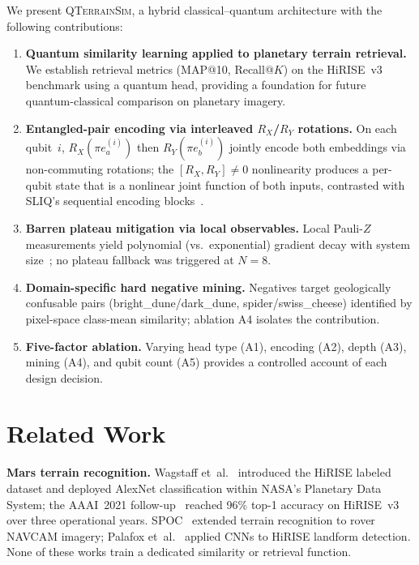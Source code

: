 \documentclass[conference,a4paper]{IEEEtran}
\newcommand{\qts}{\textsc{QTerrainSim}}
\newcommand{\RX}{R_X}
\newcommand{\RY}{R_Y}
\newcommand{\PauliZ}{Z}
\begin{document}
We present \qts{}, a hybrid classical–quantum architecture with the
following contributions:

\begin{enumerate}
\item \textbf{Quantum similarity learning applied to planetary terrain
      retrieval.}
      We establish retrieval metrics (MAP@10, Recall@$K$) on the
      HiRISE~v3 benchmark using a quantum head, providing a foundation for
      future quantum-classical comparison on planetary imagery.

\item \textbf{Entangled-pair encoding via interleaved \boldmath$\RX$/$\RY$
      rotations.}
      On each qubit~$i$, $\RX(\pi e_a^{(i)})$ then $\RY(\pi e_b^{(i)})$
      jointly encode both embeddings via non-commuting rotations; the
      $[\RX,\RY]\neq0$ nonlinearity produces a per-qubit state that is a
      nonlinear joint function of both inputs, contrasted with SLIQ's
      sequential encoding blocks~\cite{silver2023sliq}.

\item \textbf{Barren plateau mitigation via local observables.}
      Local Pauli-$\PauliZ$ measurements yield polynomial (vs.\ exponential)
      gradient decay with system size~\cite{cerezo2021costbarren}; no
      plateau fallback was triggered at $N=8$.

\item \textbf{Domain-specific hard negative mining.}
      Negatives target geologically confusable pairs (bright\_dune/dark\_dune,
      spider/swiss\_cheese) identified by pixel-space class-mean similarity;
      ablation A4 isolates the contribution.

\item \textbf{Five-factor ablation.}
      Varying head type (A1), encoding (A2), depth (A3), mining (A4), and
      qubit count (A5) provides a controlled account of each design decision.
\end{enumerate}


\section{Related Work}
\label{sec:related}

\textbf{Mars terrain recognition.}
Wagstaff et~al.~\cite{wagstaff2018deepmars} introduced the HiRISE labeled
dataset and deployed AlexNet classification within NASA's Planetary Data
System; the AAAI~2021 follow-up~\cite{wagstaff2021mars} reached 96\%
top-1 accuracy on HiRISE~v3 over three operational years.
SPOC~\cite{rothrock2016spoc} extended terrain recognition to rover NAVCAM
imagery; Palafox et~al.~\cite{palafox2017automated} applied CNNs to HiRISE
landform detection.
None of these works train a dedicated similarity or retrieval function.
\end{document}
